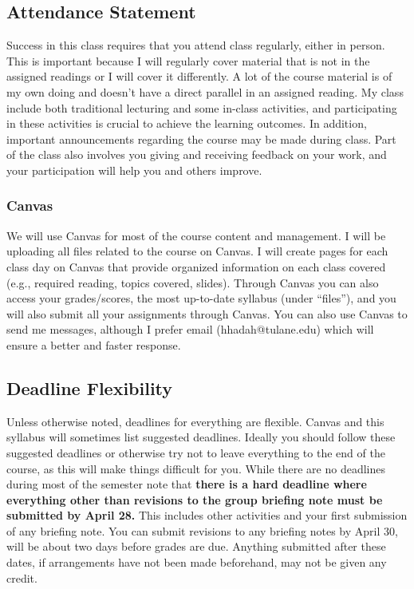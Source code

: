 \documentclass[11pt,letterpaper,final]{article}
\begin{document}
\subsection{Attendance Statement} 
Success in this class requires that you attend class regularly, either in person. This is important because I will regularly cover material that is not in the assigned readings or I will cover it differently. A lot of the course material is of my own doing and doesn't have a direct parallel in an assigned reading. My class include both traditional lecturing and some in-class activities, and participating in these activities is crucial to achieve the learning outcomes. In addition, important announcements regarding the course may be made during class. Part of the class also involves you giving and receiving feedback on your work, and your participation will help you and others improve.

\subsubsection{Canvas}
We will use Canvas for most of the course content and management. I will be uploading all files related to the course on Canvas. I will create pages for each class day on Canvas that provide organized information on each class covered (e.g., required reading, topics covered, slides). Through Canvas you can also access your grades/scores, the most up-to-date syllabus (under ``files''), and you will also submit all your assignments through Canvas. You can also use Canvas to send me messages, although I prefer email (hhadah@tulane.edu) which will ensure a better and faster response.

 
\subsection{Deadline Flexibility}
Unless otherwise noted, deadlines for everything are flexible. Canvas and this syllabus will sometimes list suggested deadlines. Ideally you should follow these suggested deadlines or otherwise try not to leave everything to the end of the course, as this will make things difficult for you. While there are no deadlines during most of the semester note that \textbf{there is a hard deadline where everything other than revisions to the group briefing note must be submitted by April 28.} This includes other activities and your first submission of any briefing note. You can submit revisions to any briefing notes by April 30, will be about two days before grades are due. Anything submitted after these dates, if arrangements have not been made beforehand, may not be given any credit. 
\end{document}
